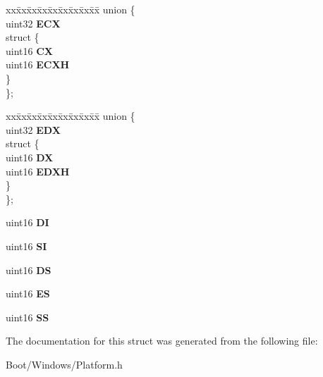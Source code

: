 \begin{DoxyCompactItemize}
\begin{tabbing}
\end{tabbing}\item 
\mbox{\label{struct_registers_a939f59ce058756b80b96fa58b2bc5fd4}} 
\begin{tabbing}
xx\=xx\=xx\=xx\=xx\=xx\=xx\=xx\=xx\=\kill
union \{\\
\>uint32 {\bfseries ECX}\\
\mbox{\label{union_registers_1_1_0D6_a43c025a3b654f1a3a3ff204884bd6598}} 
\>struct \{\\
\>\>uint16 {\bfseries CX}\\
\>\>uint16 {\bfseries ECXH}\\
\>\} \\
\}; \\

\end{tabbing}\item 
\mbox{\label{struct_registers_a4638b3c086f6efcd4cf4aab9544b4533}} 
\begin{tabbing}
xx\=xx\=xx\=xx\=xx\=xx\=xx\=xx\=xx\=\kill
union \{\\
\>uint32 {\bfseries EDX}\\
\mbox{\label{union_registers_1_1_0D8_a46c5aebf7a34606f47dbc1344d50bc80}} 
\>struct \{\\
\>\>uint16 {\bfseries DX}\\
\>\>uint16 {\bfseries EDXH}\\
\>\} \\
\}; \\

\end{tabbing}\item 
\mbox{\label{struct_registers_a3fc039c54492b61e26e6d7e3ff7c3af6}} 
uint16 {\bfseries DI}
\item 
\mbox{\label{struct_registers_a25a94357ea988990bc95d76fd8a6aa1d}} 
uint16 {\bfseries SI}
\item 
\mbox{\label{struct_registers_a8c0e5840c90778bbef19cd4b8f989a23}} 
uint16 {\bfseries DS}
\item 
\mbox{\label{struct_registers_a6147418dd7574ba8952d38d4ba272cbf}} 
uint16 {\bfseries ES}
\item 
\mbox{\label{struct_registers_a41f6e2d59d853b5f7ad114dc37e7d4b3}} 
uint16 {\bfseries SS}
\end{DoxyCompactItemize}


The documentation for this struct was generated from the following file\+:\begin{DoxyCompactItemize}
\item 
Boot/\+Windows/Platform.\+h\end{DoxyCompactItemize}
